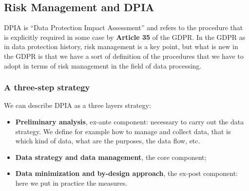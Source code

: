 \subsection{Risk Management and DPIA}
DPIA is “Data Protection Impact Assessment” and refers to the procedure that is explicitly required in some case by \textbf{Article 35} of the GDPR. In the GDPR as in data protection history, risk management is a key point, but what is new in the GDPR is that we have a sort of definition of the procedures that we have to adopt in terms of risk management in the field of data processing.
\subsubsection{A three-step strategy}
We can describe DPIA as a three layers strategy:
\begin{itemize}
    \item \textbf{Preliminary analysis}, ex-ante component: necessary to carry out the data strategy. We define for example how to manage and collect data, that is which kind of data, what are the purposes, the data flow, etc.
    \item \textbf{Data strategy and data management}, the core component;
    \item \textbf{Data minimization and by-design approach}, the ex-post component: here we put in practice the measures.
\end{itemize}
